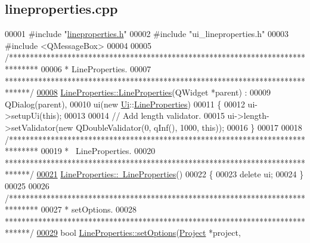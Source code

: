 \hypertarget{lineproperties_8cpp_source}{}\subsection{lineproperties.\+cpp}
\label{lineproperties_8cpp_source}

\begin{DoxyCode}
00001 \textcolor{preprocessor}{#include "\hyperlink{lineproperties_8h}{lineproperties.h}"}
00002 \textcolor{preprocessor}{#include "ui\_lineproperties.h"}
00003 \textcolor{preprocessor}{#include <QMessageBox>}
00004 
00005 \textcolor{comment}{/*******************************************************************************}
00006 \textcolor{comment}{ * LineProperties.}
00007 \textcolor{comment}{ ******************************************************************************/}
\hypertarget{lineproperties_8cpp_source_l00008}{}\hyperlink{class_line_properties_a0bc0d7c02db0a4ea920d040f76679fec}{00008} \hyperlink{class_line_properties_a0bc0d7c02db0a4ea920d040f76679fec}{LineProperties::LineProperties}(QWidget *parent) :
00009   QDialog(parent),
00010   ui(new \hyperlink{namespace_ui}{Ui}::\hyperlink{class_line_properties}{LineProperties})
00011 \{
00012   ui->setupUi(\textcolor{keyword}{this});
00013 
00014   \textcolor{comment}{// Add length validator.}
00015   ui->length->setValidator(\textcolor{keyword}{new} QDoubleValidator(0, qInf(), 1000, \textcolor{keyword}{this}));
00016 \}
00017 
00018 \textcolor{comment}{/*******************************************************************************}
00019 \textcolor{comment}{ * ~LineProperties.}
00020 \textcolor{comment}{ ******************************************************************************/}
\hypertarget{lineproperties_8cpp_source_l00021}{}\hyperlink{class_line_properties_a59017a6580f2e02dc492522d9267de29}{00021} \hyperlink{class_line_properties_a59017a6580f2e02dc492522d9267de29}{LineProperties::~LineProperties}()
00022 \{
00023   \textcolor{keyword}{delete} ui;
00024 \}
00025 
00026 \textcolor{comment}{/*******************************************************************************}
00027 \textcolor{comment}{ * setOptions.}
00028 \textcolor{comment}{ ******************************************************************************/}
\hypertarget{lineproperties_8cpp_source_l00029}{}\hyperlink{class_line_properties_ac14e88843b60ac7130a11c057306379a}{00029} \textcolor{keywordtype}{bool} \hyperlink{class_line_properties_ac14e88843b60ac7130a11c057306379a}{LineProperties::setOptions}(\hyperlink{class_project}{Project} *project, 

\end{DoxyCode}
